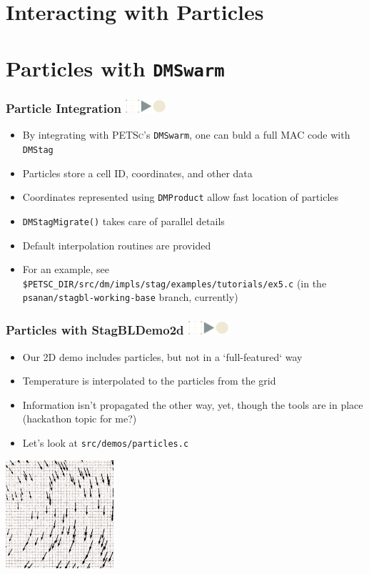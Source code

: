 \documentclass{beamer}
\newcommand\frametitlelogo[1]{\frametitle{#1\hspace{0pt plus 1 filll} \includegraphics[width=42pt]{logo_slides}}}
\newcommand{\PETSc}{\textsc{PETSc}}
\begin{document}
\section{Interacting with Particles}

\section{Particles with \texttt{DMSwarm}}

\begin{frame}[fragile]
\frametitlelogo{Particle Integration}
  \begin{itemize}
    \item By integrating with \PETSc{}'s \texttt{DMSwarm}, one can buld a full MAC code with \texttt{DMStag}
    \item Particles store a cell ID, coordinates, and other data
    \item Coordinates represented using \texttt{DMProduct} allow fast location of particles
    \item \lstinline{DMStagMigrate()} takes care of parallel details
      \item Default interpolation routines are provided
    \item For an example, see
\lstinline{$PETSC_DIR/src/dm/impls/stag/examples/tutorials/ex5.c}
(in the \texttt{psanan/stagbl-working-base} branch, currently)
  \end{itemize}
\end{frame}


\begin{frame}[fragile]
  \frametitlelogo{Particles with StagBLDemo2d}
  \begin{itemize}
      \item Our 2D demo includes particles, but not in a `full-featured` way
        \item Temperature is interpolated to the particles from the grid
        \item Information isn't propagated the other way, yet, though the tools are in place (hackathon topic for me?)
        \item Let's look at \texttt{src/demos/particles.c}
  \end{itemize}
  \begin{center}
    \includegraphics[width=0.3\textwidth]{images/2d_particles_closeup.png}
  \end{center}
\end{frame}
\end{document}
